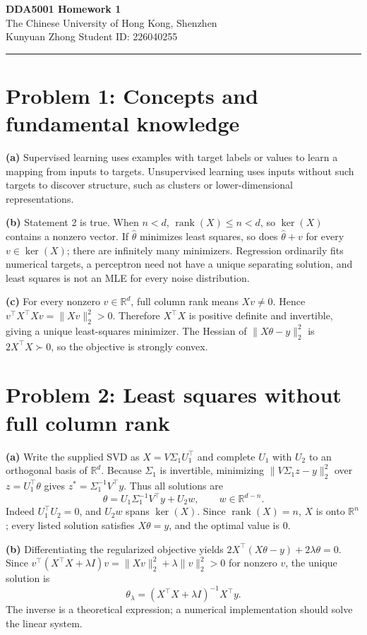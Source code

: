 \documentclass[11pt,a4paper]{article}
\newcommand{\R}{\mathbb R}
\begin{document}
\begin{center}{\Large\bfseries\color{CoursePurple}DDA5001 Homework 1}\\[4pt]
The Chinese University of Hong Kong, Shenzhen\\[2pt]
\small Kunyuan Zhong \quad Student ID: 226040255\end{center}
\noindent\rule{\linewidth}{0.8pt}

\section*{Problem 1: Concepts and fundamental knowledge}
\textbf{(a)} Supervised learning uses examples with target labels or values to learn a mapping from inputs to targets. Unsupervised learning uses inputs without such targets to discover structure, such as clusters or lower-dimensional representations.

\textbf{(b)} Statement 2 is true. When $n<d$, $\operatorname{rank}(X)\leq n<d$, so $\ker(X)$ contains a nonzero vector. If $\hat\theta$ minimizes least squares, so does $\hat\theta+v$ for every $v\in\ker(X)$; there are infinitely many minimizers. Regression ordinarily fits numerical targets, a perceptron need not have a unique separating solution, and least squares is not an MLE for every noise distribution.

\textbf{(c)} For every nonzero $v\in\R^d$, full column rank means $Xv\neq0$. Hence $v^\top X^\top Xv=\|Xv\|_2^2>0$. Therefore $X^\top X$ is positive definite and invertible, giving a unique least-squares minimizer. The Hessian of $\|X\theta-y\|_2^2$ is $2X^\top X\succ0$, so the objective is strongly convex.

\section*{Problem 2: Least squares without full column rank}
\textbf{(a)} Write the supplied SVD as $X=V\Sigma_1U_1^\top$ and complete $U_1$ with $U_2$ to an orthogonal basis of $\R^d$. Because $\Sigma_1$ is invertible, minimizing $\|V\Sigma_1z-y\|_2^2$ over $z=U_1^\top\theta$ gives $z^*=\Sigma_1^{-1}V^\top y$. Thus all solutions are
\[\boxed{\theta=U_1\Sigma_1^{-1}V^\top y+U_2w,\qquad w\in\R^{d-n}.}\]
Indeed $U_1^\top U_2=0$, and $U_2w$ spans $\ker(X)$. Since $\operatorname{rank}(X)=n$, $X$ is onto $\R^n$; every listed solution satisfies $X\theta=y$, and the optimal value is $0$.

\textbf{(b)} Differentiating the regularized objective yields $2X^\top(X\theta-y)+2\lambda\theta=0$. Since $v^\top(X^\top X+\lambda I)v=\|Xv\|_2^2+\lambda\|v\|_2^2>0$ for nonzero $v$, the unique solution is
\[\boxed{\theta_\lambda=(X^\top X+\lambda I)^{-1}X^\top y.}\]
The inverse is a theoretical expression; a numerical implementation should solve the linear system.
\end{document}
